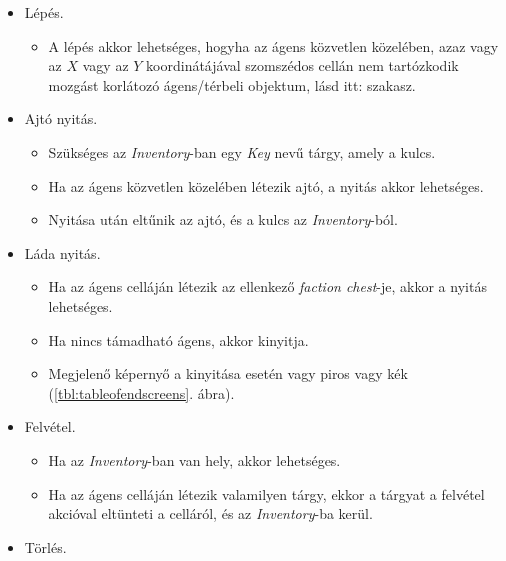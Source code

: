 \begin{itemize}

    \item Lépés. 
    
    \begin{itemize}
        \item A lépés akkor lehetséges, hogyha az ágens közvetlen közelében, azaz vagy az $X$ vagy az $Y$ koordinátájával szomszédos cellán nem tartózkodik mozgást korlátozó ágens/térbeli objektum, lásd itt:  szakasz.
    \end{itemize}

    \item Ajtó nyitás. 
    
    \begin{itemize}
        \item Szükséges az \textit{Inventory}-ban egy \textit{Key} nevű tárgy, amely a kulcs.
        \item Ha az ágens közvetlen közelében létezik ajtó, a nyitás akkor lehetséges.
        \item Nyitása után eltűnik az ajtó, és a kulcs az \textit{Inventory}-ból.
    \end{itemize}

    \item Láda nyitás. 
    
    \begin{itemize}
        \item Ha az ágens celláján létezik az ellenkező \textit{faction chest}-je, akkor a nyitás lehetséges.
        \item Ha nincs támadható ágens, akkor kinyitja.
        \item Megjelenő képernyő a kinyitása esetén vagy piros vagy kék (\ref{tbl:tableofendscreens}. ábra).
    \end{itemize}

    \item Felvétel. 
    
    \begin{itemize}
        \item Ha az \textit{Inventory}-ban van hely, akkor lehetséges.
        \item Ha az ágens celláján létezik valamilyen tárgy, ekkor a tárgyat a felvétel akcióval eltünteti a celláról, és az \textit{Inventory}-ba kerül.
    \end{itemize}

    \item Törlés. 
    

\end{itemize}
